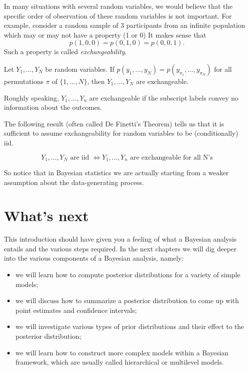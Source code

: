 \documentclass[
]{book}
\begin{document}
In many situations with several random variables, we would believe that the specific order of observation of these random variables is not important. For example, consider a random sample of 3 participants from an infinite population which may or may not have a property (1 or 0) It makes sense that
\[
p(1,0,0) = p(0,1,0) = p(0,0,1).
\]
Such a property is called \emph{exchangeability}.

Let \(Y_1,\dots,Y_N\) be random variables. If \(p(y_1,\dots,y_N)=p(y_{\pi_1},\dots,y_{\pi_N})\) for all permutations \(\pi\) of \(\{1,\dots,N\}\), then \(Y_1,\dots,Y_N\) are exchangeable.

Roughly speaking, \(Y_1,\dots, Y_n\) are exchangeable if the subscript labels convey no information about the outcomes.

The following result (often called De Finetti's Theorem) tells us that it is sufficient to assume exchangeability for random variables to be (conditionally) iid.

\[
Y_1,\dots,Y_N \mbox{ are iid } \Longleftrightarrow Y_1,\dots,Y_n \mbox{ are exchangeable for all N's}
\]

So notice that in Bayesian statistics we are actually starting from a weaker assumption about the data-generating process.

\hypertarget{whats-next}{%
\section{What's next}\label{whats-next}}

This introduction should have given you a feeling of what a Bayesian analysis entails and the various steps required. In the next chapters we will dig deeper into the various components of a Bayesian analysis, namely:

\begin{itemize}
\item
  we will learn how to compute posterior distributions for a variety of simple models;
\item
  we will discuss how to summarize a posterior distribution to come up with point estimates and confidence intervals;
\item
  we will investigate various types of prior distributions and their effect to the posterior distribution;
\item
  we will learn how to construct more complex models within a Bayesian framework, which are usually called hierarchical or multilevel models.
\end{itemize}
\end{document}
